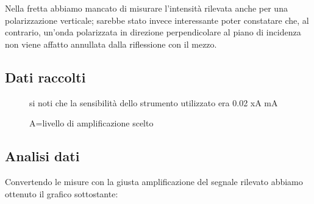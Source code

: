 \documentclass{article}
\theoremstyle{definition}
\begin{document}
\noindent Nella fretta abbiamo mancato di misurare l'intensità rilevata anche per una polarizzazione verticale; sarebbe stato invece interessante poter constatare che, al contrario, un'onda polarizzata in direzione perpendicolare al piano di incidenza non viene affatto annullata dalla riflessione con il mezzo.\\

\pagebreak

\subsection{Dati raccolti}

\begin{figure}[!htbp]
    	\captionsetup{labelformat=empty}
    \caption{si noti che la sensibilità dello strumento utilizzato era 0.02 xA mA}
    	\caption{A=livello di amplificazione scelto}
\end{figure}



\subsection{Analisi dati}
Convertendo le misure con la giusta amplificazione del segnale rilevato abbiamo ottenuto il grafico sottostante:
\end{document}
